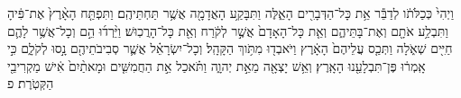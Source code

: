\documentclass{openreader}
\begin{document}
וַיְהִי֙ כְּכַלֹּתֹ֔ו לְדַבֵּ֕ר אֵ֥ת כָּל־הַדְּבָרִ֖ים הָאֵ֑לֶּה וַתִּבָּקַ֥ע הָאֲדָמָ֖ה אֲשֶׁ֥ר תַּחְתֵּיהֶֽם׃ 
וַתִּפְתַּ֤ח הָאָ֨רֶץ֙ אֶת־פִּ֔יהָ וַתִּבְלַ֥ע אֹתָ֖ם וְאֶת־בָּתֵּיהֶ֑ם וְאֵ֤ת כָּל־הָאָדָם֙ אֲשֶׁ֣ר לְקֹ֔רַח וְאֵ֖ת כָּל־הָרֲכֽוּשׁ׃ 
וַיֵּ֨רְד֜וּ הֵ֣ם וְכָל־אֲשֶׁ֥ר לָהֶ֛ם חַיִּ֖ים שְׁאֹ֑לָה וַתְּכַ֤ס עֲלֵיהֶם֙ הָאָ֔רֶץ וַיֹּאבְד֖וּ מִתֹּ֥וךְ הַקָּהָֽל׃ 
וְכָל־יִשְׂרָאֵ֗ל אֲשֶׁ֛ר סְבִיבֹתֵיהֶ֖ם נָ֣סוּ לְקֹלָ֑ם כִּ֣י אָֽמְר֔וּ פֶּן־תִּבְלָעֵ֖נוּ הָאָֽרֶץ׃ 
וְאֵ֥שׁ יָצְאָ֖ה מֵאֵ֣ת יְהוָ֑ה וַתֹּ֗אכַל אֵ֣ת הַחֲמִשִּׁ֤ים וּמָאתַ֨יִם֙ אִ֔ישׁ מַקְרִיבֵ֖י הַקְּטֹֽרֶת׃ פ 
\end{document}
